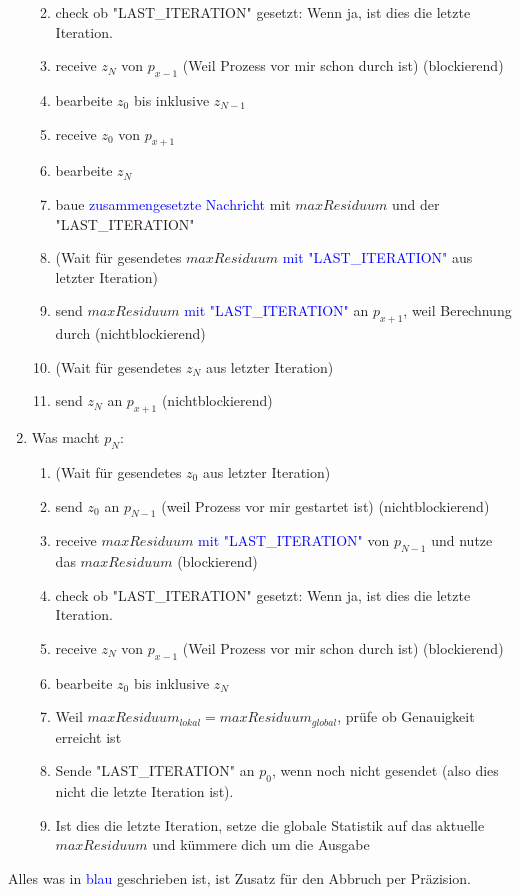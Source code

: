 \documentclass[a4paper,10pt,landscape]{article}
\begin{document}
\begin{enumerate}
\begin{enumerate}
        \color{blue}
        \item check ob "LAST\_ITERATION" gesetzt: Wenn ja, ist dies die letzte Iteration.
        \color{black}
        \item receive $z_N$ von $p_{x-1}$ (Weil Prozess vor mir schon durch ist) (blockierend)
        \item bearbeite $z_0$ bis inklusive $z_{N-1}$
        \item receive $z_0$ von $p_{x+1}$
        \item bearbeite $z_N$
        \item baue \textcolor{blue}{zusammengesetzte Nachricht} mit $maxResiduum$ und der "LAST\_ITERATION"
        \item (Wait für gesendetes $maxResiduum$ \textcolor{blue}{mit "LAST\_ITERATION"} aus letzter Iteration)
        \item send $maxResiduum$ \textcolor{blue}{mit "LAST\_ITERATION"} an $p_{x+1}$, weil Berechnung durch (nichtblockierend)
        \item (Wait für gesendetes $z_N$ aus letzter Iteration)
        \item send $z_N$ an $p_{x+1}$ (nichtblockierend)
    \end{enumerate}
    \item Was macht $p_N$:
    \begin{enumerate}
        \item (Wait für gesendetes $z_0$ aus letzter Iteration)
        \item send $z_0$ an $p_{N-1}$ (weil Prozess vor mir gestartet ist) (nichtblockierend)
        \item receive $maxResiduum$ \textcolor{blue}{mit "LAST\_ITERATION"} von $p_{N-1}$ und nutze das $maxResiduum$ (blockierend)
        \color{blue}
        \item check ob "LAST\_ITERATION" gesetzt: Wenn ja, ist dies die letzte Iteration.
        \color{black}
        \item receive $z_N$ von $p_{x-1}$ (Weil Prozess vor mir schon durch ist) (blockierend)
        \item bearbeite $z_0$ bis inklusive $z_{N}$
        \color{blue}
        \item Weil $maxResiduum_{lokal} = maxResiduum_{global}$, prüfe ob Genauigkeit erreicht ist
        \item Sende "LAST\_ITERATION" an $p_0$, wenn noch nicht gesendet (also dies nicht die letzte Iteration ist).
        \color{black}
        \item Ist dies die letzte Iteration, setze die globale Statistik auf das aktuelle $maxResiduum$ und kümmere dich um die Ausgabe
    \end{enumerate}
\end{enumerate}

Alles was in \textcolor{blue}{blau} geschrieben ist, ist Zusatz für den Abbruch per Präzision.
\end{document}
